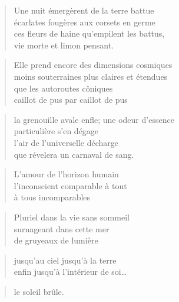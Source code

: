   \begin{verse}
    Une nuit émergèrent de la terre battue\\
    écarlates fougères aux corsets en germe\\
    ces fleurs de haine qu’empilent les battus,\\
    vie morte et limon pensant.
  \end{verse}
  \begin{verse}
    Elle prend encore des dimensions cosmiques\\
    moins souterraines plus claires et étendues\\
    que les autoroutes côniques\\
    caillot de pus par caillot de pus
  \end{verse}
  \begin{verse}
    la grenouille avale enfle; une odeur d’essence\\
    particulière s’en dégage\\
    l’air de l’universelle décharge\\
    que révelera un carnaval de sang.
  \end{verse}

  \begin{verse}
    L’amour de l’horizon humain\\
    l’inconscient comparable à tout\\
    à tous incomparables
  \end{verse}
  \begin{verse}
    Pluriel dans la vie sans sommeil\\
    surnageant dans cette mer\\
    de gruyeaux de lumière
  \end{verse}
  \begin{verse}
    jusqu’au ciel jusqu’à la terre\\
    enfin jusqu’à l’intérieur de soi…
  \end{verse}
  \begin{verse}
    le soleil brûle.
  \end{verse}
